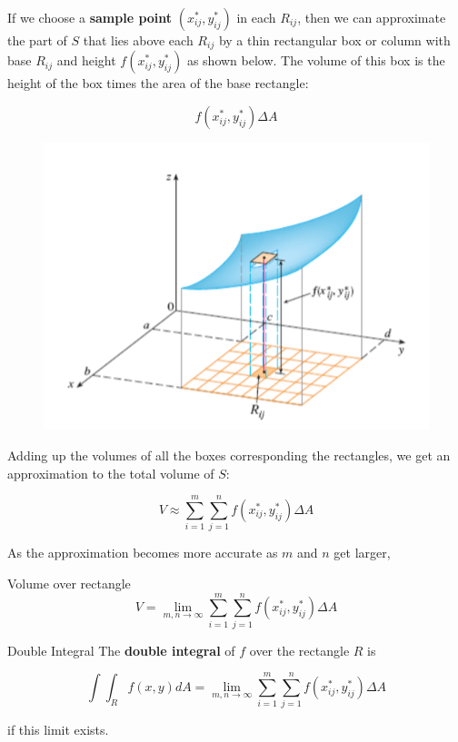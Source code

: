         If we choose a \textbf{sample point} $\left(x_{ij}^*, y^*_{ij}\right)$ in each $R_{ij}$, then we can approximate the part of $S$ that lies above each $R_{ij}$ by a thin rectangular box or column with base
        $R_{ij}$ and height $f\left(x^*_{ij}, y^*_{ij}\right)$ as shown below. The volume of this box is the height of the box times the area of the base rectangle:

        \[
            f\left(x^*_{ij}, y^*_{ij}\right) \Delta A
        \]

        \begin{figure}[hbt!]
            \centering
            \includegraphics[scale = 0.75]{Resources/15.1_Box_Volume}
        \end{figure}

        Adding up the volumes of all the boxes corresponding the rectangles, we get an approximation to the total volume of $S$:

        \[
            V \approx \sum^m_{i=1} \sum^n_{j=1} f\left(x^*_{ij}, y^*_{ij}\right) \Delta A
        \]

        As the approximation becomes more accurate as $m$ and $n$ get larger,

        \begin{theorem}{Volume over rectangle}
            \[
            V = \lim_{m, n\to \infty} \sum^m_{i=1} \sum^n_{j=1} f\left(x^*_{ij}, y^*_{ij}\right) \Delta A
            \]
        \end{theorem}

        \begin{theorem}{Double Integral}
            The \textbf{double integral} of $f$ over the rectangle $R$ is

            \[
                \int \int_R f(x,y) dA = \lim_{m, n\to \infty} \sum^m_{i=1} \sum^n_{j=1} f\left(x^*_{ij}, y^*_{ij}\right) \Delta A
            \]

            if this limit exists.
        \end{theorem}

